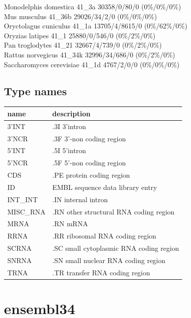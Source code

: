 \documentclass{article}
\begin{document}
\begin{Schunk}
Monodelphis domestica                   41\_3a 30358/0/80/0 (0\%/0\%/0\%)\\
Mus musculus                            41\_36b 29026/34/2/0 (0\%/0\%/0\%)\\
Oryctolagus cuniculus                   41\_1a 13705/4/8615/0 (0\%/62\%/0\%)\\
Oryzias latipes                         41\_1 25880/0/546/0 (0\%/2\%/0\%)\\
Pan troglodytes                         41\_21 32667/4/739/0 (0\%/2\%/0\%)\\
Rattus norvegicus                       41\_34k 32996/34/686/0 (0\%/2\%/0\%)\\
Saccharomyces cerevisiae                41\_1d 4767/2/0/0 (0\%/0\%/0\%)

\subsection{Type names}
\noindent\begin{tabular}{ll}
\hline \hline
name & description\\
\hline
3'INT & .3I 3'intron \\
3'NCR & .3F  3'-non coding region \\
5'INT & .5I 5'intron \\
5'NCR & .5F  5'-non coding region \\
CDS & .PE protein coding region \\
ID & EMBL sequence data library entry \\
INT\_INT & .IN  internal intron \\
MISC\_RNA & .RN other structural RNA coding region \\
MRNA & .RN mRNA \\
RRNA & .RR ribosomal RNA coding region \\
SCRNA & .SC small cytoplasmic RNA coding region \\
SNRNA & .SN small nuclear RNA coding region \\
TRNA & .TR transfer RNA coding region \\
\hline \hline
\end{tabular}

\section{ ensembl34 }

\end{Schunk}
\end{document}
